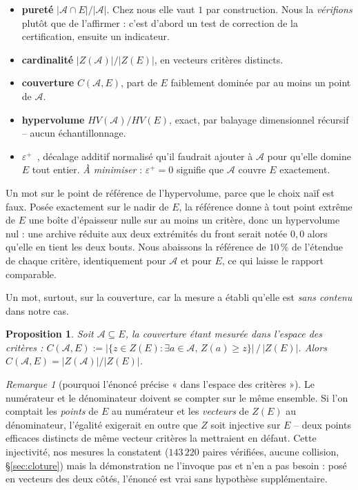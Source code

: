 \documentclass[11pt,a4paper]{article}
\theoremstyle{plain}
\newtheorem{proposition}[theorem]{Proposition}
\theoremstyle{remark}
\newtheorem{remark}{Remarque}
\begin{document}
\begin{itemize}
\item \textbf{pureté} $|\mathcal{A}\cap E|/|\mathcal{A}|$. Chez nous elle
  vaut $1$ par construction. Nous la \emph{vérifions} plutôt que de
  l'affirmer : c'est d'abord un test de correction de la certification,
  ensuite un indicateur.
\item \textbf{cardinalité} $|Z(\mathcal{A})|/|Z(E)|$, en vecteurs critères
  distincts.
\item \textbf{couverture} $C(\mathcal{A},E)$, part de $E$ faiblement dominée
  par au moins un point de $\mathcal{A}$.
\item \textbf{hypervolume} $HV(\mathcal{A})/HV(E)$, exact, par balayage
  dimensionnel récursif -- aucun échantillonnage.
\item \textbf{$\varepsilon^+$}~\cite{zitzler2003}, décalage additif
  normalisé qu'il faudrait ajouter à $\mathcal{A}$ pour qu'elle domine $E$
  tout entier. \emph{À minimiser} : $\varepsilon^+=0$ signifie que
  $\mathcal{A}$ couvre $E$ exactement.
\end{itemize}

Un mot sur le point de référence de l'hypervolume, parce que le choix naïf
est faux. Posée exactement sur le nadir de $E$, la référence donne à tout
point extrême de $E$ une boîte d'épaisseur nulle sur au moins un critère,
donc un hypervolume nul : une archive réduite aux deux extrémités du front
serait notée $0{,}0$ alors qu'elle en tient les deux bouts. Nous abaissons
la référence de $10\,\%$ de l'étendue de chaque critère, identiquement pour
$\mathcal{A}$ et pour $E$, ce qui laisse le rapport comparable.

Un mot, surtout, sur la couverture, car la mesure a établi qu'elle est
\emph{sans contenu} dans notre cas.

\begin{proposition}\label{prop:couv}
Soit $\mathcal{A}\subseteq E$, la couverture étant mesurée \emph{dans
l'espace des critères} :
$C(\mathcal{A},E):=\bigl|\{z\in Z(E):\exists a\in\mathcal{A},\,
Z(a)\ge z\}\bigr|\,/\,|Z(E)|$. Alors
$C(\mathcal{A},E)=|Z(\mathcal{A})|/|Z(E)|$.
\end{proposition}

\begin{remark}[pourquoi l'énoncé précise « dans l'espace des critères »]
Le numérateur et le dénominateur doivent se compter sur le même ensemble. Si
l'on comptait les \emph{points} de $E$ au numérateur et les \emph{vecteurs}
de $Z(E)$ au dénominateur, l'égalité exigerait en outre que $Z$ soit
injective sur $E$ -- deux points efficaces distincts de même vecteur
critères la mettraient en défaut. Cette injectivité, nos mesures la
constatent ($143\,220$ paires vérifiées, aucune collision,
§\ref{sec:cloture}) mais la démonstration ne l'invoque pas et n'en a pas
besoin : posé en vecteurs des deux côtés, l'énoncé est vrai sans hypothèse
supplémentaire.
\end{remark}
\end{document}
